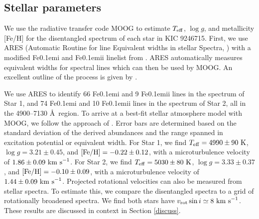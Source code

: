 \subsection{Stellar parameters}\label{parameters}
We use the radiative transfer code MOOG \citep{sne73} to estimate $T_{\rm{eff}}$, $\log g$, and metallicity [Fe/H] for the disentangled spectrum of each star in KIC 9246715. First, we use ARES (Automatic Routine for line Equivalent widths in stellar Spectra, \citealt{Sousa_2007}) with a modified {\rm Fe}\kern 0.1em{\sc i} and {\rm Fe}\kern 0.1em{\sc ii} linelist from \citet{tsa13}. ARES automatically measures equivalent widths for spectral lines which can then be used by MOOG. An excellent outline of the process is given by \citet{Sousa_2014}.

We use ARES to identify 66 {\rm Fe}\kern 0.1em{\sc i} and 9 {\rm Fe}\kern 0.1em{\sc ii} lines in the spectrum of Star 1, and 74 {\rm Fe}\kern 0.1em{\sc i} and 10 {\rm Fe}\kern 0.1em{\sc ii} lines in the spectrum of Star 2, all in the 4900--7130 \AA \ region. To arrive at a best-fit stellar atmosphere model with MOOG, we follow the approach of \citet{mag13}. Error bars are determined based on the standard deviation of the derived abundances and the range spanned in excitation potential or equivalent width. For Star 1, we find $T_{\rm{eff}} = 4990 \pm 90 \ \rm{K}$, $\log g = 3.21 \pm 0.45$, and $\rm{[Fe/H]} = -0.22 \pm 0.12$, with a microturbulence velocity of $1.86 \pm 0.09 \ \rm{km \ s}^{-1}$. For Star 2, we find $T_{\rm{eff}} = 5030 \pm 80 \ \rm{K}$, $\log g = 3.33 \pm 0.37$, and $\rm{[Fe/H]} = -0.10 \pm 0.09$, with a microturbulence velocity of $1.44 \pm 0.09 \ \rm{km \ s}^{-1}$. Projected rotational velocities can also be measured from stellar spectra. To estimate this, we compare the disentangled spectra to a grid of rotationally broadened spectra. We find both stars have $v_{\rm{rot}} \sin i \simeq 8 \ \rm{km \ s}^{-1}$. These results are discussed in context in Section \ref{discuss}.

  
  
  
  
  
  